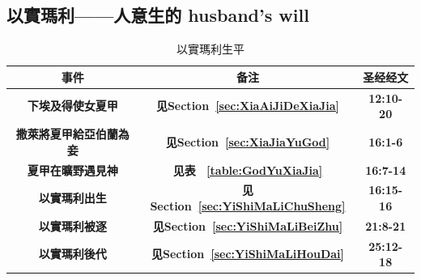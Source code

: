 \subsection{以實瑪利——人意生的 husband's will}
\begin{table}[!hbp]
\begin{threeparttable}
\begin{tabular}{c c c}
\toprule
 \multicolumn{1}{L{\dimexpr0.5\linewidth-1\tabcolsep\relax}}{\bfseries 事件} 
&\multicolumn{1}{L{\dimexpr0.2\linewidth-1\tabcolsep\relax}}{\bfseries  备注}   
&\multicolumn{1}{L{\dimexpr0.1\linewidth-1\tabcolsep\relax}}{\bfseries 圣经经文} \\\hline

\multicolumn{1}{L{\dimexpr0.5\linewidth-1\tabcolsep\relax}}{\bfseries 下埃及得使女夏甲}  
& \multicolumn{1}{L{\dimexpr0.2\linewidth-1\tabcolsep\relax}}{\bfseries  见Section~\ref{sec:XiaAiJiDeXiaJia}}
& \multicolumn{1}{L{\dimexpr0.1\linewidth-1\tabcolsep\relax}}{\bfseries 12:10-20}\\ 

\multicolumn{1}{L{\dimexpr0.5\linewidth-1\tabcolsep\relax}}{\bfseries 撒萊將夏甲給亞伯蘭為妾}  
& \multicolumn{1}{L{\dimexpr0.2\linewidth-1\tabcolsep\relax}}{\bfseries  见Section~\ref{sec:XiaJiaYuGod}}
& \multicolumn{1}{L{\dimexpr0.1\linewidth-1\tabcolsep\relax}}{\bfseries 16:1-6}\\ 

\multicolumn{1}{L{\dimexpr0.5\linewidth-1\tabcolsep\relax}}{\bfseries 夏甲在曠野遇見神}  
& \multicolumn{1}{L{\dimexpr0.2\linewidth-1\tabcolsep\relax}}{\bfseries  见表~ \ref{table:GodYuXiaJia}}
& \multicolumn{1}{L{\dimexpr0.1\linewidth-1\tabcolsep\relax}}{\bfseries 16:7-14}\\ 

\multicolumn{1}{L{\dimexpr0.5\linewidth-1\tabcolsep\relax}}{\bfseries 以實瑪利出生}  
& \multicolumn{1}{L{\dimexpr0.2\linewidth-1\tabcolsep\relax}}{\bfseries  见Section~\ref{sec:YiShiMaLiChuSheng}}
& \multicolumn{1}{L{\dimexpr0.1\linewidth-1\tabcolsep\relax}}{\bfseries 16:15-16}\\ 

\multicolumn{1}{L{\dimexpr0.5\linewidth-1\tabcolsep\relax}}{\bfseries 以實瑪利被逐}  
& \multicolumn{1}{L{\dimexpr0.2\linewidth-1\tabcolsep\relax}}{\bfseries 见Section~\ref{sec:YiShiMaLiBeiZhu}}
& \multicolumn{1}{L{\dimexpr0.1\linewidth-1\tabcolsep\relax}}{\bfseries 21:8-21}\\ 

\multicolumn{1}{L{\dimexpr0.5\linewidth-1\tabcolsep\relax}}{\bfseries 以實瑪利後代}  
& \multicolumn{1}{L{\dimexpr0.2\linewidth-1\tabcolsep\relax}}{\bfseries 见Section~\ref{sec:YiShiMaLiHouDai}}
& \multicolumn{1}{L{\dimexpr0.1\linewidth-1\tabcolsep\relax}}{\bfseries 25:12-18}\\ \hline
\end{tabular}
\caption{以實瑪利生平}
\label{table:YiShiMaLiShengPing}
\end{threeparttable}
\end{table}


